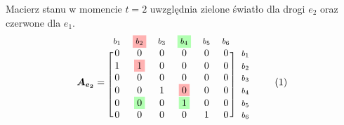 \documentclass[12pt]{book}
\theoremstyle{plain}
\newcommand\addtag{\refstepcounter{equation}
\renewcommand{\labelenumii}{\theenumii}
\renewcommand{\theenumii}{\theenumi.\arabic{enumii}.}
\tag{\theequation}}
\begin{document}
Macierz stanu w momencie $t=2$ uwzględnia zielone światło dla drogi $e_2$ oraz czerwone dla $e_1$.
\begin{equation*}
\boldsymbol{A_{e_2}}=
\begin{blockarray}{*{6}{c} l}
\begin{block}{*{6}{>{$\footnotesize}c<{$}} l}
$b_1$ & \colorbox{red!30}{$b_2$} & $b_3$ & \colorbox{green!30}{$b_4$} & $b_5$ & $b_6$ \\
\end{block}
\begin{block}{[*{6}{c}]>{$\footnotesize}l<{$}}
0 & 0                     & 0 & 0 & 0 & 0 & $b_1$ \\
1 & \colorbox{red!30}{1}  & 0 & 0 & 0 & 0 & $b_2$ \\
0 & 0                     & 0 & 0 & 0 & 0 &  $b_3$ \\
0 & 0                     & 1 & \colorbox{red!30}{0} & 0 & 0 & $b_4$ \\
0 & \colorbox{green!30}{0}  & 0 & \colorbox{green!30}{1} & 0 & 0 & $b_5$ \\
0 & 0                     & 0 & 0 & 1 & 0 & $b_6$ \\
\end{block}
\end{blockarray} \addtag
\end{equation*}






\def \xzero{
	\begin{bmatrix}
		4 \\ 5 \\ 4 \\ 2 \\ 7 \\ 1
	\end{bmatrix}
}
\end{document}
